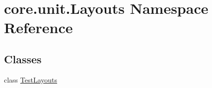 \hypertarget{namespacecore_1_1unit_1_1Layouts}{\section{core.\-unit.\-Layouts Namespace Reference}
\label{namespacecore_1_1unit_1_1Layouts}
}
\subsection*{Classes}
\begin{DoxyCompactItemize}
\item 
class \hyperlink{classcore_1_1unit_1_1Layouts_1_1TestLayouts}{Test\-Layouts}
\end{DoxyCompactItemize}
